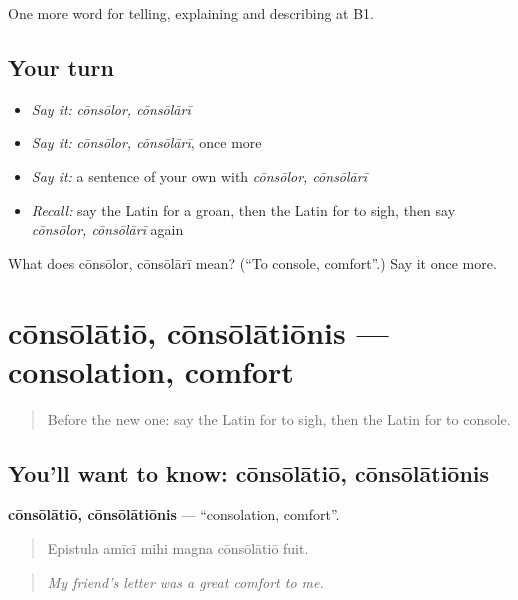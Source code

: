 \begin{grammarlens}[title={What you've built}]
One more word for telling, explaining and describing at B1.
\end{grammarlens}

\subsection*{Your turn}
\begin{itemize}
\raggedright
  \item \emph{Say it:} \emph{cōnsōlor, cōnsōlārī}
  \item \emph{Say it:} \emph{cōnsōlor, cōnsōlārī}, once more
  \item \emph{Say it:} a sentence of your own with \emph{cōnsōlor, cōnsōlārī}
  \item \emph{Recall:} say the Latin for a groan, then the Latin for to sigh, then say \emph{cōnsōlor, cōnsōlārī} again
\end{itemize}

\begin{tcolorbox}[breakable,colback=teal!4,colframe=teal!35!black,title={Before you move on}]
What does cōnsōlor, cōnsōlārī mean? (\textquotedblleft{}To console, comfort\textquotedblright{}.) Say it once more.
\end{tcolorbox}
\section[cōnsōlātiō, cōnsōlātiōnis]{cōnsōlātiō, cōnsōlātiōnis — consolation, comfort}

\label{lesson:LA-C492-consolatio}



\begin{quote}
Before the new one: say the Latin for to sigh, then the Latin for to console.
\end{quote}

\subsection*{You'll want to know: cōnsōlātiō, cōnsōlātiōnis}
\textbf{cōnsōlātiō, cōnsōlātiōnis} — \textquotedblleft{}consolation, comfort\textquotedblright{}.

\begin{quote}
Epistula amīcī mihi magna cōnsōlātiō fuit.
\end{quote}

\begin{quote}
\emph{My friend's letter was a great comfort to me.}
\end{quote}

